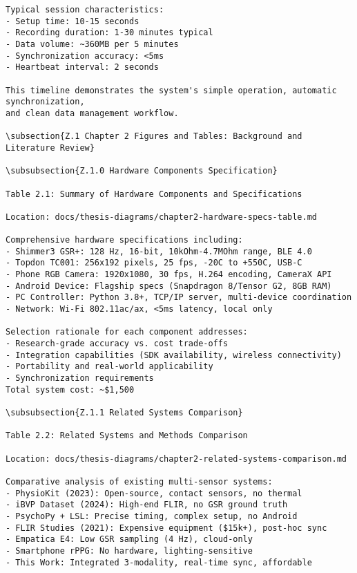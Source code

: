 \begin{verbatim}
Typical session characteristics:
- Setup time: 10-15 seconds
- Recording duration: 1-30 minutes typical
- Data volume: ~360MB per 5 minutes
- Synchronization accuracy: <5ms
- Heartbeat interval: 2 seconds

This timeline demonstrates the system's simple operation, automatic synchronization,
and clean data management workflow.

\subsection{Z.1 Chapter 2 Figures and Tables: Background and Literature Review}

\subsubsection{Z.1.0 Hardware Components Specification}

Table 2.1: Summary of Hardware Components and Specifications

Location: docs/thesis-diagrams/chapter2-hardware-specs-table.md

Comprehensive hardware specifications including:
- Shimmer3 GSR+: 128 Hz, 16-bit, 10kOhm-4.7MOhm range, BLE 4.0
- Topdon TC001: 256x192 pixels, 25 fps, -20C to +550C, USB-C
- Phone RGB Camera: 1920x1080, 30 fps, H.264 encoding, CameraX API
- Android Device: Flagship specs (Snapdragon 8/Tensor G2, 8GB RAM)
- PC Controller: Python 3.8+, TCP/IP server, multi-device coordination
- Network: Wi-Fi 802.11ac/ax, <5ms latency, local only

Selection rationale for each component addresses:
- Research-grade accuracy vs. cost trade-offs
- Integration capabilities (SDK availability, wireless connectivity)
- Portability and real-world applicability
- Synchronization requirements
Total system cost: ~$1,500

\subsubsection{Z.1.1 Related Systems Comparison}

Table 2.2: Related Systems and Methods Comparison

Location: docs/thesis-diagrams/chapter2-related-systems-comparison.md

Comparative analysis of existing multi-sensor systems:
- PhysioKit (2023): Open-source, contact sensors, no thermal
- iBVP Dataset (2024): High-end FLIR, no GSR ground truth
- PsychoPy + LSL: Precise timing, complex setup, no Android
- FLIR Studies (2021): Expensive equipment ($15k+), post-hoc sync
- Empatica E4: Low GSR sampling (4 Hz), cloud-only
- Smartphone rPPG: No hardware, lighting-sensitive
- This Work: Integrated 3-modality, real-time sync, affordable


\end{verbatim}
